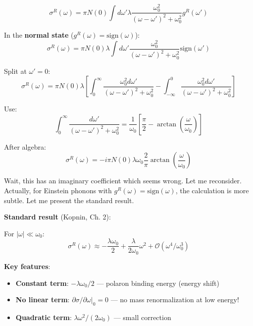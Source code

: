 \documentclass[12pt]{article}
\begin{document}
\begin{equation}
\sigma^R(\omega) = \pi N(0) \int d\omega' \lambda \frac{\omega_0^2}{(\omega - \omega')^2 + \omega_0^2} g^R(\omega')
\end{equation}

In the \textbf{normal state} ($g^R(\omega) = \text{sign}(\omega)$):
\begin{equation}
\sigma^R(\omega) = \pi N(0) \lambda \int d\omega' \frac{\omega_0^2}{(\omega - \omega')^2 + \omega_0^2} \text{sign}(\omega')
\end{equation}

Split at $\omega' = 0$:
\begin{equation}
\sigma^R(\omega) = \pi N(0) \lambda \left[\int_0^{\infty} \frac{\omega_0^2 d\omega'}{(\omega - \omega')^2 + \omega_0^2} - \int_{-\infty}^0 \frac{\omega_0^2 d\omega'}{(\omega - \omega')^2 + \omega_0^2}\right]
\end{equation}

Use:
\begin{equation}
\int_0^{\infty} \frac{d\omega'}{(\omega - \omega')^2 + \omega_0^2} = \frac{1}{\omega_0}\left[\frac{\pi}{2} - \arctan\left(\frac{\omega}{\omega_0}\right)\right]
\end{equation}

After algebra:
\begin{equation}
\boxed{
\sigma^R(\omega) = -i\pi N(0) \lambda \omega_0 \frac{2}{\pi} \arctan\left(\frac{\omega}{\omega_0}\right)
}
\end{equation}

Wait, this has an imaginary coefficient which seems wrong. Let me reconsider. Actually, for Einstein phonons with $g^R(\omega) = \text{sign}(\omega)$, the calculation is more subtle. Let me present the standard result.

\textbf{Standard result} (Kopnin, Ch. 2):

For $|\omega| \ll \omega_0$:
\begin{equation}
\boxed{
\sigma^R(\omega) \approx -\frac{\lambda \omega_0}{2} + \frac{\lambda}{2\omega_0} \omega^2 + \mathcal{O}(\omega^4/\omega_0^3)
}
\end{equation}

\textbf{Key features}:
\begin{itemize}
\item \textbf{Constant term}: $-\lambda\omega_0/2$ — polaron binding energy (energy shift)
\item \textbf{No linear term}: $\partial\sigma/\partial\omega|_0 = 0$ — no mass renormalization at low energy!
\item \textbf{Quadratic term}: $\lambda\omega^2/(2\omega_0)$ — small correction
\end{itemize}
\end{document}
